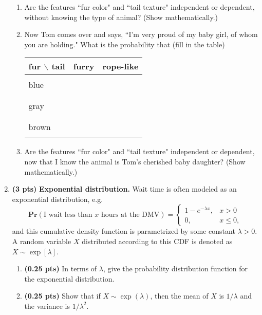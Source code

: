 \documentclass{article}
\newcommand{\pr}{\mathbf{Pr}}
\newcommand{\showpoints}[1]{\textbf{(#1)}}
\begin{document}
\begin{enumerate}
\begin{enumerate}
\item Are the features ``fur color" and ``tail texture" independent or dependent, without knowing the type of animal? (Show mathematically.)


\item Now Tom comes over and says, ``I'm very proud of my baby girl, of whom you are holding."
 What is the probability that  (fill in the table)
\begin{center}
\begin{tabular}{|l|ll|}
\hline
fur $\backslash$ tail & furry & rope-like\\\hline
&&\\blue&&\\&&\\
&&\\gray&&\\&&\\
&&\\brown&&\\&&\\
\hline
\end{tabular}
\end{center}



\item Are the features ``fur color" and ``tail texture" independent or dependent, now that I know the animal is Tom's cherished baby daughter? (Show mathematically.)


\end{enumerate}




\item \showpoints{3 pts} \textbf{Exponential distribution.} Wait time is often modeled as an exponential distribution, e.g. 
\[
\pr(\text{I  wait less than $x$ hours at the DMV}) = 
\begin{cases}
1-e^{-\lambda x}, & x > 0\\
0, & x \leq 0,
\end{cases}
\]
and this cumulative density function is parametrized by some constant $\lambda > 0$. A random variable $X$ distributed according to this CDF is denoted as $X\sim \exp[\lambda]$.

\begin{enumerate}
\item \showpoints{0.25 pts} In terms of $\lambda$, give the probability distribution function for the exponential distribution.



\item \showpoints{0.25 pts} Show that if $X\sim \exp(\lambda)$, then the mean of $X$ is $1/\lambda$ and the variance is $1/\lambda^2$.


\end{enumerate}
\end{enumerate}
\end{document}
